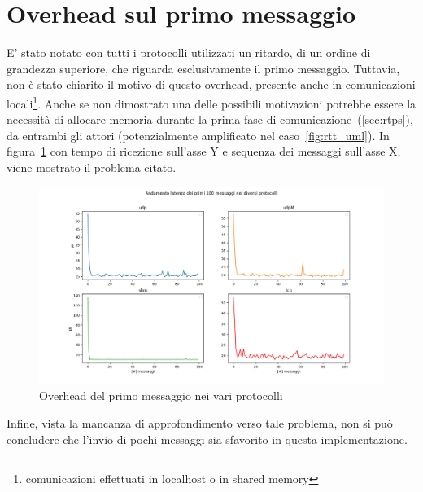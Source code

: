 \section{Overhead sul primo messaggio}
E' stato notato con tutti i protocolli utilizzati un ritardo, di un ordine di grandezza superiore, che riguarda esclusivamente il primo messaggio. Tuttavia, non è stato chiarito il motivo di questo overhead, presente anche in comunicazioni locali\footnote{comunicazioni effettuati in localhost o in shared memory}. Anche se non dimostrato una delle possibili motivazioni potrebbe essere la necessità di allocare memoria durante la prima fase di comunicazione~(\ref{sec:rtps}), da entrambi gli attori (potenzialmente amplificato nel caso~\ref{fig:rtt_uml}). In figura~\ref{fig:overhead_primo_messaggio} con tempo di ricezione sull'asse Y e sequenza dei messaggi sull'asse X, viene mostrato il problema citato.
\begin{figure}[H]
    \includegraphics[width=\textwidth]{./results/errortest.png} 
    \caption{Overhead del primo messaggio nei vari protocolli}
    \label{fig:overhead_primo_messaggio}
\end{figure}
Infine, vista la mancanza di approfondimento verso tale problema, non si può concludere che l'invio di pochi messaggi sia sfavorito in questa implementazione.

